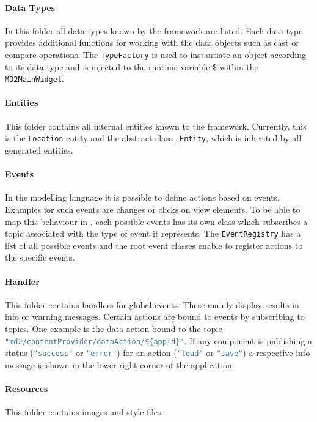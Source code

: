 \paragraph{Data Types}
In this folder all data types known by the \MD \mapapps framework are listed. Each data type provides additional functions for working with the data objects such as cast or compare operations. The \lstinline|TypeFactory| is used to instantiate an object according to its data type and is injected to the runtime variable \$ within the \lstinline|MD2MainWidget|.

\paragraph{Entities}\label{par:Entities}
This folder contains all internal entities known to the \MD \mapapps framework. Currently, this is the \lstinline|Location| entity and the abstract class \lstinline|_Entity|, which is inherited by all generated entities.

\paragraph{Events}
In the \MD modelling language it is possible to define actions based on events. Examples for such events are changes or clicks on view elements. To be able to map this behaviour in \mapapps, each possible events has its own class which subscribes a topic associated with the type of event it represents. The \lstinline|EventRegistry| has a list of all possible events and the root event classes enable to register actions to the specific events.

\paragraph{Handler}
This folder contains handlers for global events. These mainly display results in info or warning messages. Certain actions are bound to events by subscribing to topics. One example is the data action bound to the topic \lstinline[language=Javascript]|"md2/contentProvider/dataAction/${appId}"|. If any component is publishing a status (\lstinline[language=Javascript]|"success"| or \lstinline[language=Javascript]|"error"|) for an action (\eg \lstinline[language=Javascript]|"load"| or \lstinline[language=Javascript]|"save"|) a respective info message is shown in the lower right corner of the application.

\paragraph{Resources}
This folder contains images and style files.

